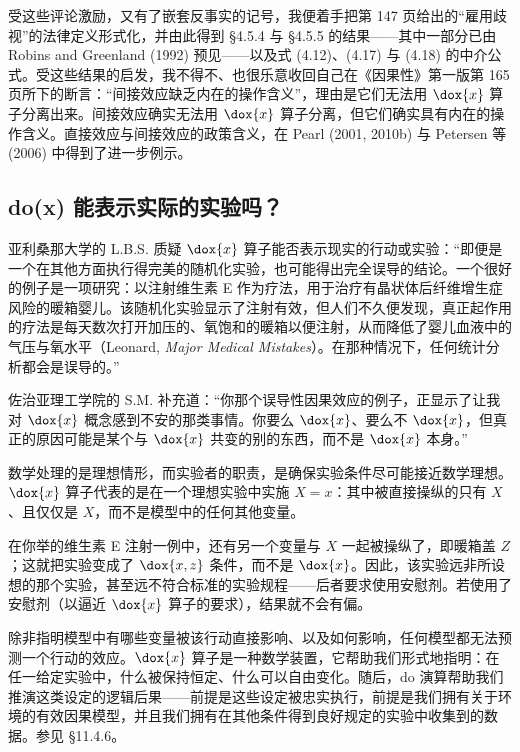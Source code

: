 受这些评论激励，又有了嵌套反事实的记号，我便着手把第 147 页给出的“雇用歧视”的法律定义形式化，并由此得到 \S4.5.4 与 \S4.5.5 的结果——其中一部分已由 Robins and Greenland (1992) 预见——以及式 \textup{(4.12)}、\textup{(4.17)} 与 \textup{(4.18)} 的中介公式。受这些结果的启发，我不得不、也很乐意收回自己在《因果性》第一版第 165 页所下的断言：“间接效应缺乏内在的操作含义”，理由是它们无法用 $\dox{x}$ 算子分离出来。间接效应确实无法用 $\dox{x}$ 算子分离，但它们确实具有内在的操作含义。直接效应与间接效应的政策含义，在 Pearl (2001, 2010b) 与 Petersen 等 (2006) 中得到了进一步例示。

\subsection{do(x) 能表示实际的实验吗？}


亚利桑那大学的 L.B.S. 质疑 $\dox{x}$ 算子能否表示现实的行动或实验：“即便是一个在其他方面执行得完美的随机化实验，也可能得出完全误导的结论。一个很好的例子是一项研究：以注射维生素 E 作为疗法，用于治疗有晶状体后纤维增生症风险的暖箱婴儿。该随机化实验显示了注射有效，但人们不久便发现，真正起作用的疗法是每天数次打开加压的、氧饱和的暖箱以便注射，从而降低了婴儿血液中的气压与氧水平（Leonard, \textit{Major Medical Mistakes}）。在那种情况下，任何统计分析都会是误导的。”

佐治亚理工学院的 S.M. 补充道：“你那个误导性因果效应的例子，正显示了让我对 $\dox{x}$ 概念感到不安的那类事情。你要么 $\dox{x}$、要么不 $\dox{x}$，但真正的原因可能是某个与 $\dox{x}$ 共变的别的东西，而不是 $\dox{x}$ 本身。”


数学处理的是理想情形，而实验者的职责，是确保实验条件尽可能接近数学理想。$\dox{x}$ 算子代表的是在一个理想实验中实施 $X=x$：其中被直接操纵的只有 $X$、且仅仅是 $X$，而不是模型中的任何其他变量。

在你举的维生素 E 注射一例中，还有另一个变量与 $X$ 一起被操纵了，即暖箱盖 $Z$；这就把实验变成了 $\dox{x,z}$ 条件，而不是 $\dox{x}$。因此，该实验远非所设想的那个实验，甚至远不符合标准的实验规程——后者要求使用安慰剂。若使用了安慰剂（以逼近 $\dox{x}$ 算子的要求），结果就不会有偏。

除非指明模型中有哪些变量被该行动直接影响、以及如何影响，任何模型都无法预测一个行动的效应。$\dox{x}$ 算子是一种数学装置，它帮助我们形式地指明：在任一给定实验中，什么被保持恒定、什么可以自由变化。随后，do 演算帮助我们推演这类设定的逻辑后果——前提是这些设定被忠实执行，前提是我们拥有关于环境的有效因果模型，并且我们拥有在其他条件得到良好规定的实验中收集到的数据。参见 \S11.4.6。

